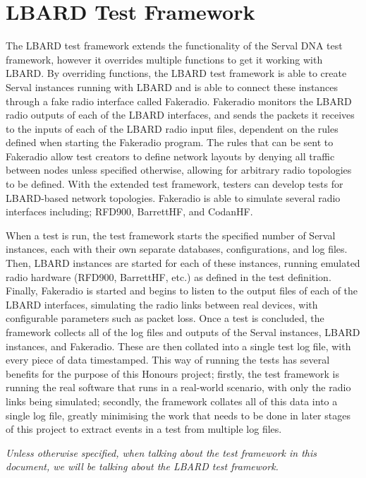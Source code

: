 \section{LBARD Test Framework}
The LBARD test framework extends the functionality of the Serval DNA test framework, however it overrides multiple functions to get it working with LBARD.
By overriding functions, the LBARD test framework is able to create Serval instances running with LBARD and is able to connect these instances through a fake radio interface called Fakeradio.
Fakeradio monitors the LBARD radio outputs of each of the LBARD interfaces, and sends the packets it receives to the inputs of each of the LBARD radio input files, dependent on the rules defined when starting the Fakeradio program.
The rules that can be sent to Fakeradio allow test creators to define network layouts by denying all traffic between nodes unless specified otherwise, allowing for arbitrary radio topologies to be defined.
With the extended test framework, testers can develop tests for LBARD-based network topologies.
Fakeradio is able to simulate several radio interfaces including; RFD900, BarrettHF, and CodanHF.


When a test is run, the test framework starts the specified number of Serval instances, each with their own separate databases, configurations, and log files.
Then, LBARD instances are started for each of these instances, running emulated radio hardware (RFD900, BarrettHF, etc.) as defined in the test definition.
Finally, Fakeradio is started and begins to listen to the output files of each of the LBARD interfaces, simulating the radio links between real devices, with configurable parameters such as packet loss.
Once a test is concluded, the framework collects all of the log files and outputs of the Serval instances, LBARD instances, and Fakeradio.
These are then collated into a single test log file, with every piece of data timestamped.
This way of running the tests has several benefits for the purpose of this Honours project; firstly, the test framework is running the real software that runs in a real-world scenario, with only the radio links being simulated; secondly, the framework collates all of this data into a single log file, greatly minimising the work that needs to be done in later stages of this project to extract events in a test from multiple log files.

\emph{Unless otherwise specified, when talking about the test framework in this document, we will be talking about the LBARD test framework.}


